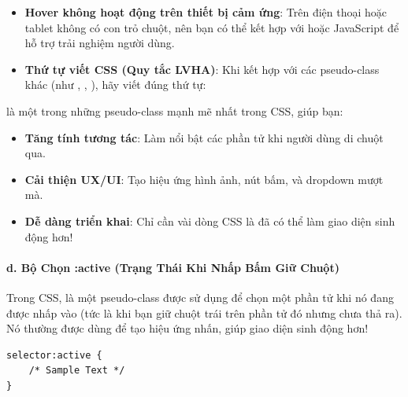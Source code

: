 \begin{warnBox}
\begin{itemize}[leftmargin=1.5em, itemsep=3pt, parsep=0pt]
    \item \textbf{Hover không hoạt động trên thiết bị cảm ứng}: Trên điện thoại hoặc tablet không có con trỏ chuột, nên bạn có thể kết hợp với  hoặc JavaScript để hỗ trợ trải nghiệm người dùng.
    \item \textbf{Thứ tự viết CSS (Quy tắc LVHA)}: Khi kết hợp với các pseudo-class khác (như , , ), hãy viết đúng thứ tự:
    \par\vspace{3pt}
\end{itemize}
\end{warnBox}

\begin{conceptBox}
 là một trong những pseudo-class mạnh mẽ nhất trong CSS, giúp bạn:
\begin{itemize}[leftmargin=1.5em, itemsep=2pt, parsep=0pt]
    \item \textbf{Tăng tính tương tác}: Làm nổi bật các phần tử khi người dùng di chuột qua.
    \item \textbf{Cải thiện UX/UI}: Tạo hiệu ứng hình ảnh, nút bấm, và dropdown mượt mà.
    \item \textbf{Dễ dàng triển khai}: Chỉ cần vài dòng CSS là đã có thể làm giao diện sinh động hơn!
\end{itemize}
\end{conceptBox}

\paragraph{d. Bộ Chọn :active (Trạng Thái Khi Nhấp Bấm Giữ Chuột)}

Trong CSS,  là một pseudo-class được sử dụng để chọn một phần tử khi nó đang được nhấp vào (tức là khi bạn giữ chuột trái trên phần tử đó nhưng chưa thả ra). Nó thường được dùng để tạo hiệu ứng nhấn, giúp giao diện sinh động hơn!

\begin{conceptBox}
\begin{codeWindow}
\begin{lstlisting}[language=CSS3]
selector:active {
    /* Sample Text */
}
\end{lstlisting}
\end{codeWindow}
\end{conceptBox}


